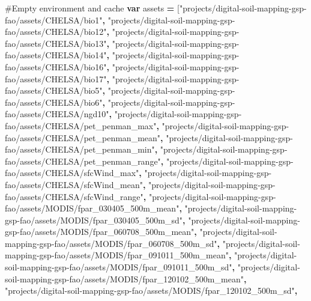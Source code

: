 \documentclass[
  10pt,
  b5paper,
  oneside]{book}
\newenvironment{Shaded}{\begin{snugshade}}{\end{snugshade}}
\newcommand{\KeywordTok}[1]{\textcolor[rgb]{0.13,0.29,0.53}{\textbf{#1}}}
\newcommand{\NormalTok}[1]{#1}
\newcommand{\OperatorTok}[1]{\textcolor[rgb]{0.81,0.36,0.00}{\textbf{#1}}}
\newcommand{\StringTok}[1]{\textcolor[rgb]{0.31,0.60,0.02}{#1}}
\begin{document}
\begin{Shaded}
\begin{Highlighting}[]
\NormalTok{\#Empty environment and cache}
\KeywordTok{var}\NormalTok{ assets }\OperatorTok{=}\NormalTok{ [}\StringTok{"projects/digital{-}soil{-}mapping{-}gsp{-}fao/assets/CHELSA/bio1"}\OperatorTok{,}
\StringTok{"projects/digital{-}soil{-}mapping{-}gsp{-}fao/assets/CHELSA/bio12"}\OperatorTok{,}
\StringTok{"projects/digital{-}soil{-}mapping{-}gsp{-}fao/assets/CHELSA/bio13"}\OperatorTok{,}
\StringTok{"projects/digital{-}soil{-}mapping{-}gsp{-}fao/assets/CHELSA/bio14"}\OperatorTok{,}
\StringTok{"projects/digital{-}soil{-}mapping{-}gsp{-}fao/assets/CHELSA/bio16"}\OperatorTok{,}
\StringTok{"projects/digital{-}soil{-}mapping{-}gsp{-}fao/assets/CHELSA/bio17"}\OperatorTok{,}
\StringTok{"projects/digital{-}soil{-}mapping{-}gsp{-}fao/assets/CHELSA/bio5"}\OperatorTok{,}
\StringTok{"projects/digital{-}soil{-}mapping{-}gsp{-}fao/assets/CHELSA/bio6"}\OperatorTok{,}
\StringTok{"projects/digital{-}soil{-}mapping{-}gsp{-}fao/assets/CHELSA/ngd10"}\OperatorTok{,}
\StringTok{"projects/digital{-}soil{-}mapping{-}gsp{-}fao/assets/CHELSA/pet\_penman\_max"}\OperatorTok{,}
\StringTok{"projects/digital{-}soil{-}mapping{-}gsp{-}fao/assets/CHELSA/pet\_penman\_mean"}\OperatorTok{,}
\StringTok{"projects/digital{-}soil{-}mapping{-}gsp{-}fao/assets/CHELSA/pet\_penman\_min"}\OperatorTok{,}
\StringTok{"projects/digital{-}soil{-}mapping{-}gsp{-}fao/assets/CHELSA/pet\_penman\_range"}\OperatorTok{,}
\StringTok{"projects/digital{-}soil{-}mapping{-}gsp{-}fao/assets/CHELSA/sfcWind\_max"}\OperatorTok{,}
\StringTok{"projects/digital{-}soil{-}mapping{-}gsp{-}fao/assets/CHELSA/sfcWind\_mean"}\OperatorTok{,}
\StringTok{"projects/digital{-}soil{-}mapping{-}gsp{-}fao/assets/CHELSA/sfcWind\_range"}\OperatorTok{,}
\StringTok{"projects/digital{-}soil{-}mapping{-}gsp{-}fao/assets/MODIS/fpar\_030405\_500m\_mean"}\OperatorTok{,}
\StringTok{"projects/digital{-}soil{-}mapping{-}gsp{-}fao/assets/MODIS/fpar\_030405\_500m\_sd"}\OperatorTok{,}
\StringTok{"projects/digital{-}soil{-}mapping{-}gsp{-}fao/assets/MODIS/fpar\_060708\_500m\_mean"}\OperatorTok{,}
\StringTok{"projects/digital{-}soil{-}mapping{-}gsp{-}fao/assets/MODIS/fpar\_060708\_500m\_sd"}\OperatorTok{,}
\StringTok{"projects/digital{-}soil{-}mapping{-}gsp{-}fao/assets/MODIS/fpar\_091011\_500m\_mean"}\OperatorTok{,}
\StringTok{"projects/digital{-}soil{-}mapping{-}gsp{-}fao/assets/MODIS/fpar\_091011\_500m\_sd"}\OperatorTok{,}
\StringTok{"projects/digital{-}soil{-}mapping{-}gsp{-}fao/assets/MODIS/fpar\_120102\_500m\_mean"}\OperatorTok{,}
\StringTok{"projects/digital{-}soil{-}mapping{-}gsp{-}fao/assets/MODIS/fpar\_120102\_500m\_sd"}\OperatorTok{,}

\end{Highlighting}
\end{Shaded}
\end{document}

